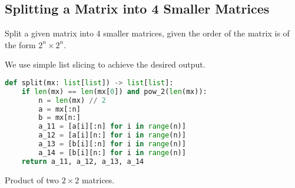 \subsection{Splitting a Matrix into 4 Smaller Matrices}
\begin{eg}
	Split a given matrix into 4 smaller matrices, given the order of the matrix is of the form $2^n\times 2^n$.
\end{eg}
\begin{explanation}
	We use simple list slicing to achieve the desired output.
	\begin{lstlisting}[language=Python, numbers=none]
def split(mx: list[list]) -> list[list]:
	if len(mx) == len(mx[0]) and pow_2(len(mx)):
		n = len(mx) // 2
		a = mx[:n]
		b = mx[n:]
		a_11 = [a[i][:n] for i in range(n)]
		a_12 = [a[i][n:] for i in range(n)]
		a_13 = [b[i][:n] for i in range(n)]
		a_14 = [b[i][n:] for i in range(n)]
	return a_11, a_12, a_13, a_14 \end{lstlisting}
\end{explanation}
\begin{theorem}
	Product of two $2\times 2$ matrices.
\end{theorem}
